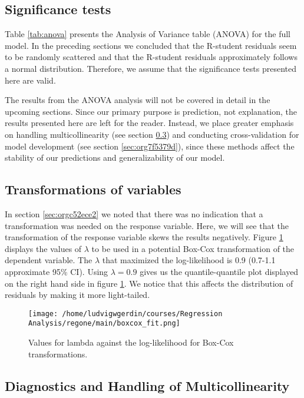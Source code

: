 \documentclass[11pt]{article}
\begin{document}
\subsection{Significance tests}
\label{sec:orgcc2fca1}

Table \ref{tab:anova} presents the Analysis of Variance table (ANOVA) for the full model. In the 
preceding sections we concluded that the R-student residuals seem to be randomly scattered and 
that the R-student residuals approximately follows a normal distribution. Therefore, we assume 
that the significance tests presented here are valid. 

The results from the ANOVA analysis will not be covered in detail in the upcoming sections. Since
our primary purpose is prediction, not explanation, the results presented here are left for the 
reader. Instead, we place greater emphasis on handling multicollinearity 
(see section \ref{sec:org9c6e392}) and conducting
cross-validation for model development (see section \ref{sec:org7f5379d}),
since these methods affect the stability of our predictions and generalizability of our model.



\subsection{Transformations of variables}
\label{sec:orgea65746}

In section \ref{sec:orgc52ece2} we noted that there was no indication that a transformation was needed on the 
response variable. Here, we will see that the transformation of the response variable skews the results negatively.
Figure \ref{fig:orge9c21e7} displays the values of \(\lambda\) to be used in a potential Box-Cox transformation of 
the dependent variable. The \(\lambda\) that maximized the log-likelihood is 0.9 
(0.7-1.1 approximate 95\% CI). Using \(\lambda = 0.9\) gives us the quantile-quantile plot displayed on the 
right hand side in figure \ref{fig:orge9c21e7}. We notice that this affects the distribution of residuals by
making it more light-tailed. 

\begin{figure}[H]
\centering
\texttt{[image: /home/ludvigwgerdin/courses/Regression Analysis/regone/main/boxcox\_fit.png]}
\caption{\label{fig:orge9c21e7}
Values for lambda against the log-likelihood for Box-Cox transformations.}
\end{figure}

\subsection{Diagnostics and Handling of Multicollinearity}
\label{sec:org9c6e392}
\end{document}
